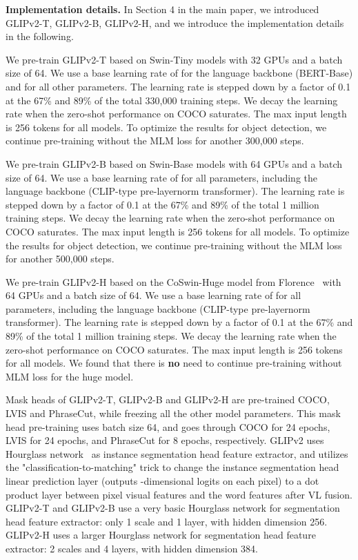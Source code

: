 \documentclass{article}
\newcommand{\our}{GLIPv2\xspace}
\newcommand{\ourT}{GLIPv2-T\xspace}
\newcommand{\ourB}{GLIPv2-B\xspace}
\newcommand{\ourH}{GLIPv2-H\xspace}
\begin{document}
\textbf{Implementation details.}
In Section 4 in the main paper, we introduced GLIPv2-T, GLIPv2-B, GLIPv2-H, and we introduce the implementation details in the following.

We pre-train \ourT based on Swin-Tiny models with 32 GPUs and a batch size of 64. We use a base learning rate of  for the language backbone (BERT-Base) and  for all other parameters. The learning rate is stepped down by a factor of 0.1 at the 67\% and 89\% of the total 330,000 training steps. We decay the learning rate when the zero-shot performance on COCO saturates. The max input length is 256 tokens for all models. To optimize the results for object detection, we continue pre-training without the MLM loss for another 300,000 steps. 

We pre-train \ourB based on Swin-Base models with 64 GPUs and a batch size of 64. We use a base learning rate of  for all parameters, including the language backbone (CLIP-type pre-layernorm transformer). The learning rate is stepped down by a factor of 0.1 at the 67\% and 89\% of the total 1 million training steps. We decay the learning rate when the zero-shot performance on COCO saturates. The max input length is 256 tokens for all models. To optimize the results for object detection, we continue pre-training without the MLM loss for another 500,000 steps. 

We pre-train \ourH based on the CoSwin-Huge model from Florence~\cite{yuan2021florence} with 64 GPUs and a batch size of 64. We use a base learning rate of  for all parameters, including the language backbone (CLIP-type pre-layernorm transformer). The learning rate is stepped down by a factor of 0.1 at the 67\% and 89\% of the total 1 million training steps. We decay the learning rate when the zero-shot performance on COCO saturates. The max input length is 256 tokens for all models. We found that there is \textbf{no} need to continue pre-training without MLM loss for the huge model.

Mask heads of \ourT, \ourB and \ourH are pre-trained COCO, LVIS and PhraseCut, while freezing all the other model parameters. This mask head pre-training uses batch size 64, and goes through COCO for 24 epochs, LVIS for 24 epochs, and PhraseCut for 8 epochs, respectively. \our uses Hourglass network~\cite{newell2016stacked} as instance segmentation head feature extractor, and utilizes the "classification-to-matching" trick to change the instance segmentation head linear prediction layer (outputs -dimensional logits on each pixel) to a dot product layer between pixel visual features and the word features after VL fusion. \ourT and \ourB use a very basic Hourglass network for segmentation head feature extractor: only 1 scale and 1 layer, with hidden dimension 256. \ourH uses a larger Hourglass network for segmentation head feature extractor: 2 scales and 4 layers, with hidden dimension 384.
\end{document}
